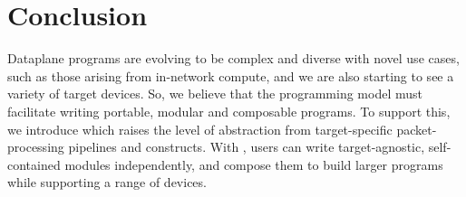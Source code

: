 \documentclass[letterpaper,twocolumn,10pt]{article}
\begin{document}
\section{Conclusion}
Dataplane programs are evolving to be complex and diverse with novel
use cases, such as those arising from in-network compute, and we are
also starting to see a variety of target devices. So, we believe that
the programming model must facilitate writing portable, modular and
composable programs. To support this, we introduce \ulang which raises
the level of abstraction from target-specific packet-processing
pipelines and constructs. With \ulang, users can write
target-agnostic, self-contained modules independently, and compose
them to build larger programs while supporting a range of devices.



\clearpage




\appendix
\end{document}
